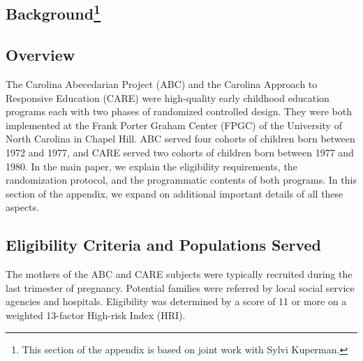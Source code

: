 \begin{appendices}
\setcounter{figure}{0}  \renewcommand{\thefigure}{A.\arabic{figure}}
\setcounter{table}{0}   \renewcommand{\thetable}{A.\arabic{table}}

\section[Background]{Background\footnote{This section of the appendix is based on joint work with Sylvi Kuperman.}} \label{appendix:background}

\subsection{Overview}

\noindent The Carolina Abecedarian Project (ABC) and the Carolina Approach to Responsive Education (CARE) were high-quality early childhood education programs each with two phases of randomized controlled design. They were both implemented at the Frank Porter Graham Center (FPGC) of the University of North Carolina in Chapel Hill. ABC served four cohorts of children born between 1972 and 1977, and CARE served two cohorts of children born between 1977 and 1980. In the main paper, we explain the eligibility requirements, the randomization protocol, and the programmatic contents of both programs. In this section of the appendix, we expand on additional important details of all these aspects.

\subsection{Eligibility Criteria and Populations Served}

\noindent The mothers of the ABC and CARE subjects were typically recruited during the last trimester  of pregnancy. Potential families were referred by local social service agencies and hospitals. Eligibility was determined by a score of 11 or more on a weighted 13-factor High-risk Index (HRI).\\


\end{appendices}
